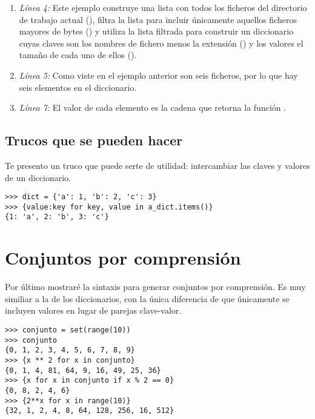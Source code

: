 \begin{enumerate}

\item \emph{Línea 4:} Este ejemplo construye una lista con todos los ficheros del directorio de trabajo actual (), filtra la lista para incluir únicamente aquellos ficheros mayores de  bytes () y utiliza la lista filtrada para construir un diccionario cuyas claves son los nombres de fichero menos la extensión () y los valores el tamaño de cada uno de ellos ().

\item \emph{Línea 5:} Como viste en el ejemplo anterior son seis ficheros, por lo que hay seis elementos en el diccionario.

\item \emph{Línea 7:} El valor de cada elemento es la cadena que retorna la función .

\end{enumerate}

\subsection{Trucos que se pueden hacer}

Te presento un truco que puede serte de utilidad: intercambiar las claves y valores de un diccionario.

\noindent\begin{minipage}{\textwidth}
\begin{lstlisting}[mathescape=True]
>>> dict = {'a': 1, 'b': 2, 'c': 3}
>>> {value:key for key, value in a_dict.items()}
{1: 'a', 2: 'b', 3: 'c'}
\end{lstlisting}
\end{minipage}

\section{Conjuntos por comprensión}

Por último mostraré la sintaxis para generar conjuntos por comprensión. Es muy similiar a la de los diccionarios, con la única diferencia de que únicamente se incluyen valores en lugar de parejas clave-valor.

\noindent\begin{minipage}{\textwidth}
\begin{lstlisting}[mathescape=True]
>>> conjunto = set(range(10))
>>> conjunto
{0, 1, 2, 3, 4, 5, 6, 7, 8, 9}
>>> {x ** 2 for x in conjunto}
{0, 1, 4, 81, 64, 9, 16, 49, 25, 36}
>>> {x for x in conjunto if x % 2 == 0}
{0, 8, 2, 4, 6}
>>> {2**x for x in range(10)}
{32, 1, 2, 4, 8, 64, 128, 256, 16, 512}
\end{lstlisting}
\end{minipage}

